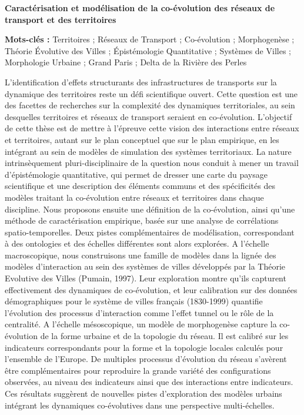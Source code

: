 \documentclass[9pt]{article}
\begin{document}


\noindent\textbf{Caractérisation et modélisation de la co-évolution des réseaux de transport et des territoires}

\bigskip

\noindent\textbf{Mots-clés : } Territoires ; Réseaux de Transport ; Co-évolution ; Morphogenèse ; Théorie Évolutive des Villes ; Épistémologie Quantitative ; Systèmes de Villes ; Morphologie Urbaine ; Grand Paris ; Delta de la Rivière des Perles

\bigskip

\noindent
L'identification d'effets structurants des infrastructures de transports sur la dynamique des territoires reste un défi scientifique ouvert. Cette question est une des facettes de recherches sur la complexité des dynamiques territoriales, au sein desquelles territoires et réseaux de transport seraient en co-évolution. L'objectif de cette thèse est de mettre à l'épreuve cette vision des interactions entre réseaux et territoires, autant sur le plan conceptuel que sur le plan empirique, en les intégrant au sein de modèles de simulation des systèmes territoriaux. La nature intrinsèquement pluri-disciplinaire de la question nous conduit à mener un travail d'épistémologie quantitative, qui permet de dresser une carte du paysage scientifique et une description des éléments communs et des spécificités des modèles traitant la co-évolution entre réseaux et territoires dans chaque discipline. Nous proposons ensuite une définition de la co-évolution, ainsi qu'une méthode de caractérisation empirique, basée sur une analyse de corrélations spatio-temporelles. Deux pistes complémentaires de modélisation, correspondant à des ontologies et des échelles différentes sont alors explorées. A l'échelle macroscopique, nous construisons une famille de modèles dans la lignée des modèles d'interaction au sein des systèmes de villes développés par la Théorie Evolutive des Villes (Pumain, 1997). Leur exploration montre qu'ils capturent effectivement des dynamiques de co-évolution, et leur calibration sur des données démographiques pour le système de villes français (1830-1999) quantifie l'évolution des processus d'interaction comme l'effet tunnel ou le rôle de la centralité. A l'échelle mésoscopique, un modèle de morphogenèse capture la co-évolution de la forme urbaine et de la topologie du réseau. Il est calibré sur les indicateurs correspondants pour la forme et la topologie locales calculés pour l'ensemble de l'Europe. De multiples processus d'évolution du réseau s'avèrent être complémentaires pour reproduire la grande variété des configurations observées, au niveau des indicateurs ainsi que des interactions entre indicateurs. Ces résultats suggèrent de nouvelles pistes d'exploration des modèles urbains intégrant les dynamiques co-évolutives dans une perspective multi-échelles.
\end{document}
